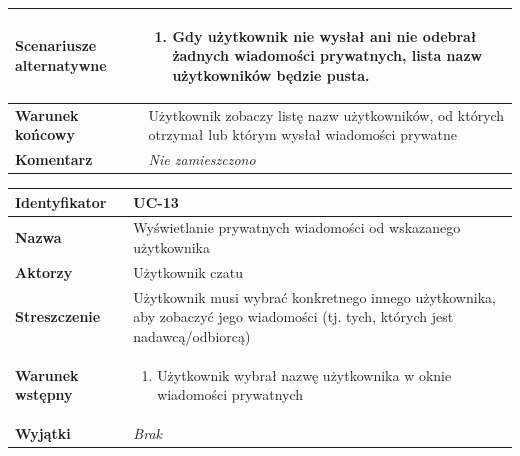 \documentclass[11pt,oneside,a4paper,titlepage,onecolumn]{article}
\newenvironment{enumreq}
{ \begin{enumerate}[topsep=0pt,itemsep=-1ex,partopsep=1ex,parsep=1ex] }
{ \end{enumerate}                  }
\begin{document}
{\begin{tabular}{ | l | l | }
	\hline
		\parbox[t]{4cm}{\textbf{Scenariusze alternatywne}} & \parbox[t]
		{11cm}{
			\begin{enumreq}
				\item Gdy użytkownik nie wysłał ani nie odebrał żadnych
				wiadomości prywatnych, lista nazw użytkowników będzie pusta.
			\end{enumreq}
		}
		\\
		
	\hline
		\parbox[t]{4cm}{\textbf{Warunek końcowy}} & \parbox[t]{11cm}{
			Użytkownik zobaczy listę nazw użytkowników, od których
			otrzymał lub którym wysłał wiadomości prywatne
		}
		\\
		
	\hline
		\parbox[t]{4cm}{\textbf{Komentarz}} & \parbox[t]{11cm}{
			\textit{Nie zamieszczono}
		}
		\\

	\hline
\end{tabular}

\vspace{2em}

\begin{tabular}{ | l | l | }
	\hline
		\textbf{Identyfikator} & 
		UC-13
		\\
		
	\hline
		\textbf{Nazwa} & 
		Wyświetlanie prywatnych wiadomości od wskazanego użytkownika
		\\
		
	\hline
		\textbf{Aktorzy} & \parbox[t]{11cm}{
			Użytkownik czatu
		}\\
		 
	\hline
		\parbox[t]{4cm}{\textbf{Streszczenie}} & \parbox[t]{11cm}{
			Użytkownik musi wybrać konkretnego innego użytkownika,
			aby zobaczyć jego wiadomości (tj. tych, których jest
			nadawcą/odbiorcą)
			
		}\\
		
	\hline
		\parbox[t]{4cm}{\textbf{Warunek wstępny}} & \parbox[t]{11cm}{
			\begin{enumreq}
				\item Użytkownik wybrał nazwę użytkownika w oknie wiadomości
				 prywatnych
			\end{enumreq}
				
		}
		\\
		
	\hline
		\parbox[t]{4cm}{\textbf{Wyjątki}} & \parbox[t]{11cm}{
			\textit{Brak}
			
		}
		\\


\end{tabular}}
\end{document}

